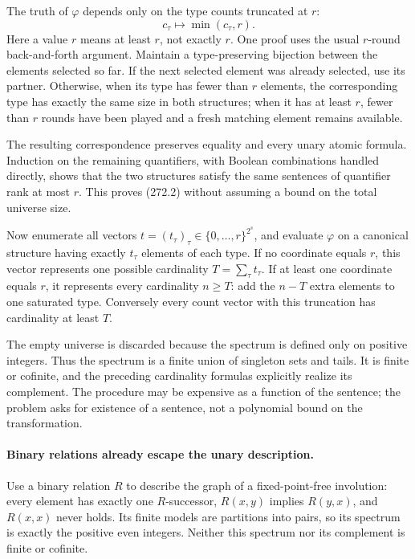 \documentclass[11pt]{article}
\begin{document}
The truth of $\varphi$ depends only on the type counts truncated at $r$:
\[
 c_\tau\longmapsto \min(c_\tau,r).
 \tag{272.2}
\]
Here a value $r$ means at least $r$, not exactly $r$. One proof uses the usual $r$-round back-and-forth argument. Maintain a type-preserving bijection between the elements selected so far. If the next selected element was already selected, use its partner. Otherwise, when its type has fewer than $r$ elements, the corresponding type has exactly the same size in both structures; when it has at least $r$, fewer than $r$ rounds have been played and a fresh matching element remains available.

The resulting correspondence preserves equality and every unary atomic formula. Induction on the remaining quantifiers, with Boolean combinations handled directly, shows that the two structures satisfy the same sentences of quantifier rank at most $r$. This proves (272.2) without assuming a bound on the total universe size.

Now enumerate all vectors
$t=(t_\tau)_\tau\in\{0,\ldots,r\}^{2^s}$, and evaluate $\varphi$ on a canonical structure having exactly $t_\tau$ elements of each type. If no coordinate equals $r$, this vector represents one possible cardinality
$T=\sum_\tau t_\tau$. If at least one coordinate equals $r$, it represents every cardinality $n\ge T$: add the $n-T$ extra elements to one saturated type. Conversely every count vector with this truncation has cardinality at least $T$.

The empty universe is discarded because the spectrum is defined only on positive integers. Thus the spectrum is a finite union of singleton sets and tails. It is finite or cofinite, and the preceding cardinality formulas explicitly realize its complement. The procedure may be expensive as a function of the sentence; the problem asks for existence of a sentence, not a polynomial bound on the transformation.

\paragraph{Binary relations already escape the unary description.}
Use a binary relation $R$ to describe the graph of a fixed-point-free involution: every element has exactly one $R$-successor, $R(x,y)$ implies $R(y,x)$, and $R(x,x)$ never holds. Its finite models are partitions into pairs, so its spectrum is exactly the positive even integers. Neither this spectrum nor its complement is finite or cofinite.
\end{document}
